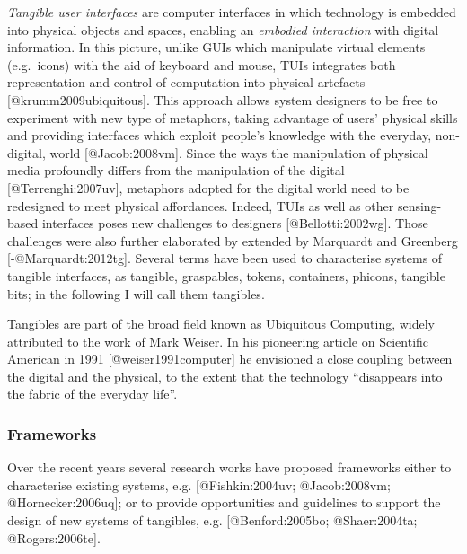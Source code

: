 \emph{Tangible user interfaces} are computer interfaces in which
technology is embedded into physical objects and spaces, enabling an
\emph{embodied interaction} with digital information. In this picture,
unlike GUIs which manipulate virtual elements (e.g.~icons) with the aid
of keyboard and mouse, TUIs integrates both representation and control
of computation into physical artefacts {[}@krumm2009ubiquitous{]}. This
approach allows system designers to be free to experiment with new type
of metaphors, taking advantage of users' physical skills and providing
interfaces which exploit people's knowledge with the everyday,
non-digital, world {[}@Jacob:2008vm{]}. Since the ways the manipulation
of physical media profoundly differs from the manipulation of the
digital {[}@Terrenghi:2007uv{]}, metaphors adopted for the digital world
need to be redesigned to meet physical affordances. Indeed, TUIs as well
as other sensing-based interfaces poses new challenges to designers
{[}@Bellotti:2002wg{]}. Those challenges were also further elaborated by
extended by Marquardt and Greenberg {[}-@Marquardt:2012tg{]}. Several
terms have been used to characterise systems of tangible interfaces, as
tangible, graspables, tokens, containers, phicons, tangible bits; in the
following I will call them tangibles.

Tangibles are part of the broad field known as Ubiquitous Computing,
widely attributed to the work of Mark Weiser. In his pioneering article
on Scientific American in 1991 {[}@weiser1991computer{]} he envisioned a
close coupling between the digital and the physical, to the extent that
the technology ``disappears into the fabric of the everyday life''.

\subsubsection{Frameworks}\label{frameworks}

Over the recent years several research works have proposed frameworks
either to characterise existing systems, e.g. {[}@Fishkin:2004uv;
@Jacob:2008vm; @Hornecker:2006uq{]}; or to provide opportunities and
guidelines to support the design of new systems of tangibles, e.g.
{[}@Benford:2005bo; @Shaer:2004ta; @Rogers:2006te{]}.

